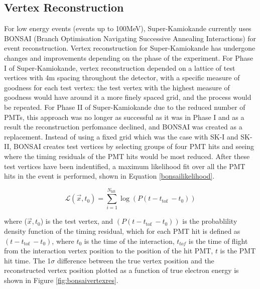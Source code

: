 \subsection{Vertex Reconstruction}
For low energy events (events up to 100MeV), Super-Kamiokande currently uses BONSAI (Branch Optimisation Navigating Successive Annealing Interactions) for event reconstruction. Vertex reconstruction for Super-Kamiokande has undergone changes and improvements depending on the phase of the experiment. 
\newline{}
For Phase I of Super-Kamiokande, vertex reconstruction depended on a lattice of test vertices with 4m spacing throughout the detector, with a specific measure of goodness for each test vertex: the test vertex with the highest measure of goodness would have around it a more finely spaced grid, and the process would be repeated. For Phase II of Super-Kamiokande due to the reduced number of PMTs, this approach was no longer as successful as it was in Phase I and as a result the reconstruction perfomance declined, and BONSAI was created as a replacement. Instead of using a fixed grid which was the case with SK-I and SK-II, BONSAI creates test vertices by selecting groups of four PMT hits and seeing where the timing residuals of the PMT hits would be most reduced. After these test vertices have been indentified, a maximum likelihood fit over all the PMT hits in the event is performed, shown in Equation \ref{bonsailikelihood}.

\begin{equation}
    \mathcal{L}(\vec{x}, t_{0})=\sum_{i=1}^{N_{\text {hlt }}} \log (P(t-t_{\text {tof }}-t_{0}))
\label{bonsailikelihood}
\end{equation}

where ($\vec{x}, t_{0}$) is the test vertex, and $(P(t-t_{\text {tof }}-t_{0}))$ is the probablility density function of the timing residual, which for each PMT hit is defined as $(t-t_{\text {tof }}-t_{0})$, where $t_{0}$ is the time of the interaction, $t_{tof}$ is the time of flight from the interaction vertex position to the position of the hit PMT, $t$ is the PMT hit time. The 1$\sigma$ difference between the true vertex position and the reconstructed vertex position plotted as a function of true electron energy is shown in Figure \ref{fig:bonsaivertexres}. 

